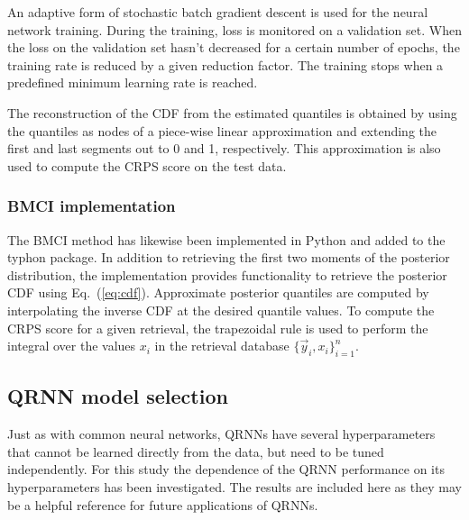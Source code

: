 \documentclass[journal abbreviation, manuscript]{copernicus}
\begin{document}

  An adaptive form of stochastic batch gradient descent is used for the neural
  network training. During the training, loss is monitored on a validation set.
  When the loss on the validation set hasn't decreased for a certain number of
  epochs, the training rate is reduced by a given reduction factor. The training
  stops when a predefined minimum learning rate is reached.

  The reconstruction of the CDF from the estimated quantiles is obtained
  by using the quantiles as nodes of a piece-wise linear approximation and
  extending the first and last segments out to 0 and 1, respectively.
  This approximation is also used to compute the CRPS score on the test
  data.


\subsubsection{BMCI implementation}
\label{sec:implementation_bmci}

 The BMCI method has likewise been implemented in Python and added to the
 typhon package. In addition to retrieving the first two moments of the
 posterior distribution, the implementation provides functionality to
 retrieve the posterior CDF using Eq.~(\ref{eq:cdf}). Approximate posterior
 quantiles are computed by interpolating the inverse CDF at the desired quantile
 values. To compute the CRPS score for a given retrieval, the trapezoidal rule
 is used to perform the integral over the values $x_i$ in the retrieval database
 $\{\vec{y}_i, x_i\}_{i = 1}^n$.

\subsection{QRNN model selection}

Just as with common neural networks, QRNNs have several hyperparameters that cannot
be learned directly from the data, but need to be tuned independently. For this
study the dependence of the QRNN performance on its hyperparameters has been
investigated. The results are included here as they may be a helpful reference
for future applications of QRNNs.
\end{document}
